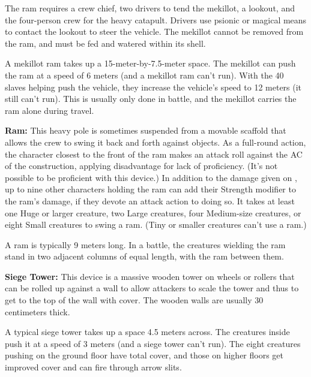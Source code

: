 The ram requires a crew chief, two drivers to tend the mekillot, a lookout, and the four-person crew for the heavy catapult. Drivers use psionic or magical means to contact the lookout to steer the vehicle. The mekillot cannot be removed from the ram, and must be fed and watered within its shell.

A mekillot ram takes up a 15-meter-by-7.5-meter space. The mekillot can push the ram at a speed of 6 meters (and a mekillot ram can't run). With the 40 slaves helping push the vehicle, they increase the vehicle's speed to 12 meters (it still can't run). This is usually only done in battle, and the mekillot carries the ram alone during travel.

\textbf{Ram:} This heavy pole is sometimes suspended from a movable scaffold that allows the crew to swing it back and forth against objects. As a full-round action, the character closest to the front of the ram makes an attack roll against the AC of the construction, applying disadvantage for lack of proficiency. (It's not possible to be proficient with this device.) In addition to the damage given on , up to nine other characters holding the ram can add their Strength modifier to the ram's damage, if they devote an attack action to doing so. It takes at least one Huge or larger creature, two Large creatures, four Medium-size creatures, or eight Small creatures to swing a ram. (Tiny or smaller creatures can't use a ram.)

A ram is typically 9 meters long. In a battle, the creatures wielding the ram stand in two adjacent columns of equal length, with the ram between them.

\textbf{Siege Tower:} This device is a massive wooden tower on wheels or rollers that can be rolled up against a wall to allow attackers to scale the tower and thus to get to the top of the wall with cover. The wooden walls are usually 30 centimeters thick.

A typical siege tower takes up a space 4.5 meters across. The creatures inside push it at a speed of 3 meters (and a siege tower can't run). The eight creatures pushing on the ground floor have total cover, and those on higher floors get improved cover and can fire through arrow slits.

